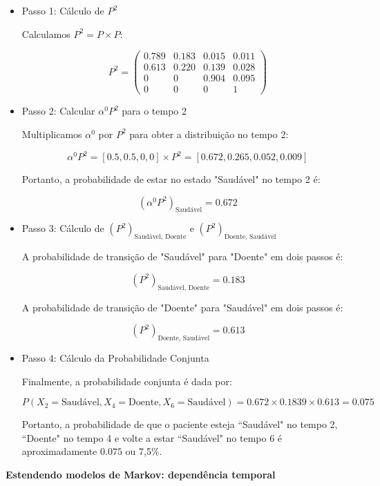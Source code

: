 \documentclass[12pt, a4paper, openany]{book}
\numberwithin{equation}{chapter}
\numberwithin{table}{chapter}
\numberwithin{figure}{chapter}
\theoremstyle{break}
\begin{document}
\begin{itemize}
\item Passo 1: Cálculo de \( P^2 \)

Calculamos \( P^2 = P \times P \):

\[
P^2 = \begin{pmatrix}
    0.789 & 0.183 & 0.015 & 0.011 \\
    0.613 & 0.220 & 0.139 & 0.028 \\
    0 & 0 &0.904 & 0.095 \\
    0 & 0 & 0 & 1
\end{pmatrix}
\]

\item Passo 2: Calcular \( \alpha^0 P^2 \) para o tempo 2

Multiplicamos \( \alpha^0 \) por \( P^2 \) para obter a distribuição no tempo 2:

\[
\alpha^0 P^2 = [0.5, 0.5, 0, 0] \times P^2 = [0.672, 0.265,0.052,   0.009]
\]

Portanto, a probabilidade de estar no estado "Saudável" no tempo 2 é:

\[
(\alpha^0 P^2)_{\text{Saudável}} = 0.672
\]

\item Passo 3: Cálculo de \( (P^2)_{\text{Saudável, Doente}} \) e \( (P^2)_{\text{Doente, Saudável}} \)

A probabilidade de transição de "Saudável" para "Doente" em dois passos é:

\[
(P^2)_{\text{Saudável, Doente}} = 0.183
\]

A probabilidade de transição de "Doente" para "Saudável" em dois passos é:

\[
(P^2)_{\text{Doente, Saudável}} = 0.613
\]

\item Passo 4: Cálculo da Probabilidade Conjunta

Finalmente, a probabilidade conjunta é dada por:

\[
P(X_2 = \text{Saudável}, X_4 = \text{Doente}, X_6 = \text{Saudável}) = 0.672 \times 0.1839 \times 0.613 = 0.075
\]

Portanto, a probabilidade de que o paciente esteja ``Saudável" no tempo 2, ``Doente" no tempo 4 e volte a estar ``Saudável" no tempo 6 é aproximadamente \( 0.075 \) ou 7,5\%.

\end{itemize}




\textbf{Estendendo modelos de Markov: dependência temporal}
\end{document}
